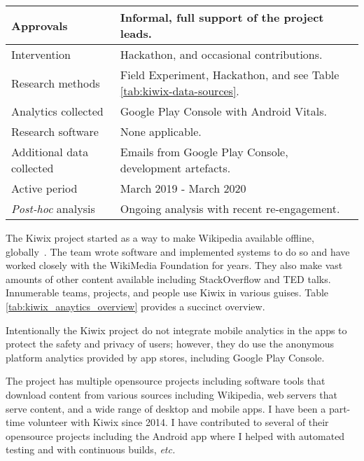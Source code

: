 {\begin{table*}
\begin{tabular}{lp{9cm}}
       Approvals &Informal, full support of the project leads. \\
       \midrule
       Intervention &Hackathon, and occasional contributions. \\
       Research methods &Field Experiment, Hackathon, and see Table \ref{tab:kiwix-data-sources}.  \\
       Analytics collected &Google Play Console with Android Vitals. \\
       Research software & None applicable. \\
       Additional data collected &Emails from Google Play Console, development artefacts. \\
       Active period & March 2019 - March 2020 \\
       \midrule
       \emph{Post-hoc} analysis & Ongoing analysis with recent re-engagement. \\ 
       \bottomrule
    \end{tabular}
    \caption{Case Study key facts: Kiwix}
    \label{tab:kiwix_anaytics_overview}
\end{table*}
}

The Kiwix project started as a way to make Wikipedia available offline, globally~. The team wrote software and implemented systems to do so and have worked closely with the WikiMedia Foundation for years. They also make vast amounts of other content available including StackOverflow and TED talks. Innumerable teams, projects, and people use Kiwix in various guises. Table \ref{tab:kiwix_anaytics_overview} provides a succinct overview.

Intentionally the Kiwix project do not integrate mobile analytics in the apps to protect the safety and privacy of users; however, they do use the anonymous platform analytics provided by app stores, including Google Play Console.

The project has multiple opensource projects including software tools that download content from various sources including Wikipedia, web servers that serve content, and a wide range of desktop and mobile apps. I have been a part-time volunteer with Kiwix since 2014. I have contributed to several of their opensource projects including the Android app where I helped with automated testing and with continuous builds, \emph{etc.} %

